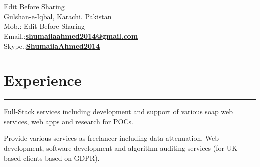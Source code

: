 \documentclass[]{ShumailaAhmed-Resume}
\begin{document}
\hfill
\begin{minipage}[t]{0.66\textwidth} 
\hspace*{0pt}\hfill    \\
\hspace*{0pt}\hfill    \\
\hspace*{0pt}\hfill Edit Before Sharing\\
\hspace*{0pt}\hfill Gulshan-e-Iqbal, Karachi. Pakistan\\
\hspace*{0pt}\hfill Mob.: Edit Before Sharing \\
\hspace*{0pt}\hfill Email.:\textbf{\href{mailto:shumailaahmed2014@gmail.com}{shumailaahmed2014@gmail.com}} \\
\hspace*{0pt}\hfill %
\hspace*{0pt}\hfill Skype.:\textbf{\href{}{ShumailaAhmed2014}}
\section{Experience}
\noindent\rule{12.5cm}{0.4pt}
 
\noindent
\hspace{5em}%
\begin{minipage}{0.85\textwidth\vspace{2pt}}
Full-Stack services including development and support of various soap web services, web apps and research for POCs.\\
\end{minipage}

\sectionsep

 
\descript{ }
\noindent
\hspace{5em}%
\begin{minipage}{0.85\textwidth\vspace{2pt}}
Provide various services as freelancer including data attenuation, Web development, software development and algorithm auditing services (for UK based clients based on GDPR).
\end{minipage}
\sectionsep


\end{minipage}
\end{document}
